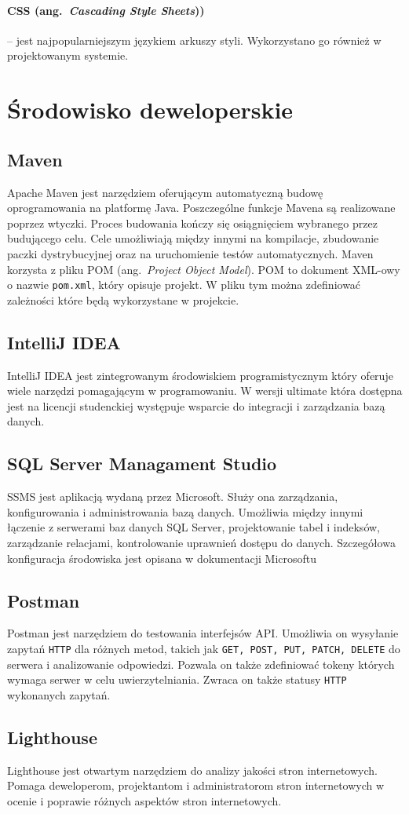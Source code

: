\paragraph{CSS (ang.~\emph{Cascading Style Sheets}))} -- jest najpopularniejszym językiem arkuszy styli. Wykorzystano go również w projektowanym systemie.

\section{Środowisko deweloperskie}
\subsection{Maven}
Apache Maven jest narzędziem oferującym automatyczną budowę oprogramowania na platformę Java. Poszczególne funkcje Mavena są realizowane poprzez wtyczki. Proces budowania kończy się osiągnięciem wybranego przez budującego celu. Cele umożliwiają między innymi na kompilacje, zbudowanie paczki dystrybucyjnej oraz na uruchomienie testów automatycznych. Maven korzysta z pliku POM (ang.~\emph{Project Object Model}). POM to dokument XML-owy o nazwie \texttt{pom.xml}, który opisuje projekt. W pliku tym można zdefiniować zależności które będą wykorzystane w projekcie. 

\subsection{IntelliJ IDEA} %
IntelliJ IDEA jest zintegrowanym środowiskiem programistycznym który oferuje wiele narzędzi pomagającym w programowaniu. W wersji ultimate która dostępna jest na licencji studenckiej występuje wsparcie do integracji i zarządzania bazą danych.

\subsection{SQL Server Managament Studio}
\label{ssms:label}
SSMS jest aplikacją wydaną przez Microsoft. Służy ona zarządzania, konfigurowania i administrowania bazą danych. Umożliwia między innymi łączenie z serwerami baz danych SQL Server, projektowanie tabel i indeksów, zarządzanie relacjami, kontrolowanie uprawnień dostępu do danych. Szczegółowa konfiguracja środowiska jest opisana w dokumentacji Microsoftu \cite{ssms}

\subsection{Postman}
Postman jest narzędziem do testowania interfejsów API. Umożliwia on wysyłanie zapytań \texttt{HTTP} dla różnych metod, takich jak \texttt{GET, POST, PUT, PATCH, DELETE} do serwera i analizowanie odpowiedzi. Pozwala on także zdefiniować tokeny których wymaga serwer w celu uwierzytelniania. Zwraca on także statusy \texttt{HTTP} wykonanych zapytań.

\subsection{Lighthouse}
Lighthouse jest otwartym narzędziem do analizy jakości stron internetowych. Pomaga deweloperom, projektantom i administratorom stron internetowych w ocenie i poprawie różnych aspektów stron internetowych.

